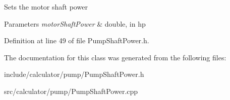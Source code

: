 Sets the motor shaft power 
\begin{DoxyParams}{Parameters}
{\em motor\+Shaft\+Power} & double, in hp \\
\hline
\end{DoxyParams}


Definition at line 49 of file Pump\+Shaft\+Power.\+h.



The documentation for this class was generated from the following files\+:\begin{DoxyCompactItemize}
\item 
include/calculator/pump/Pump\+Shaft\+Power.\+h\item 
src/calculator/pump/Pump\+Shaft\+Power.\+cpp\end{DoxyCompactItemize}
